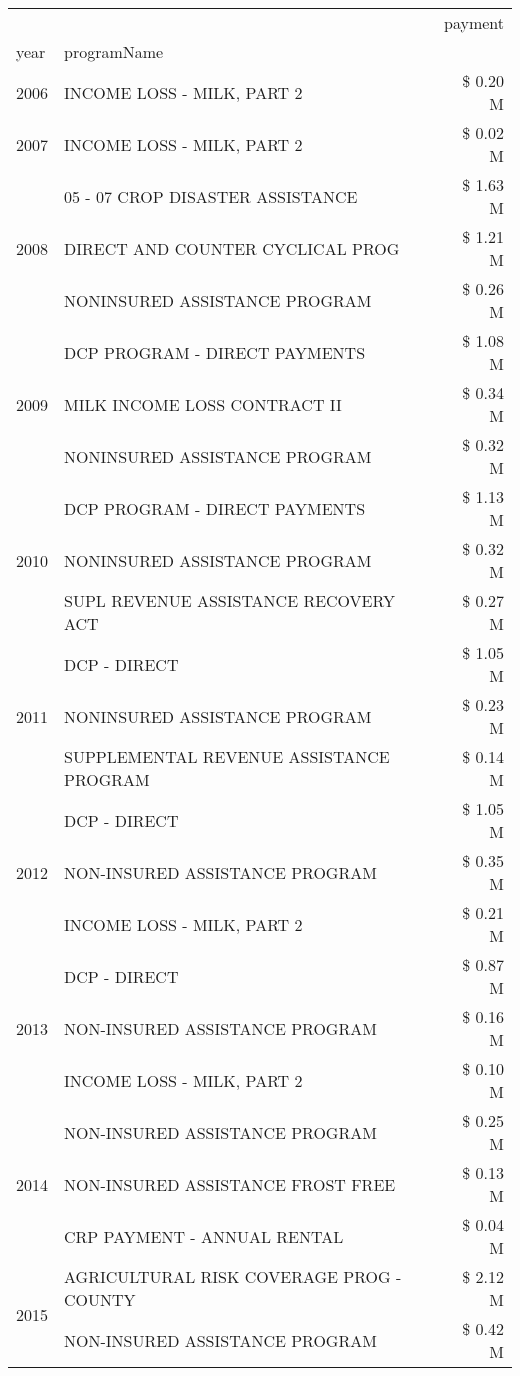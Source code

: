 \begin{tabular}{llr}
\toprule
 &  & payment \\
year & programName &  \\
\midrule
2006 & INCOME LOSS - MILK, PART 2 & \$ 0.20 M \\
\cline{1-3}
2007 & INCOME LOSS - MILK, PART 2 & \$ 0.02 M \\
\cline{1-3}
\multirow[t]{3}{*}{2008} & 05 - 07 CROP DISASTER ASSISTANCE & \$ 1.63 M \\
 & DIRECT AND COUNTER CYCLICAL PROG & \$ 1.21 M \\
 & NONINSURED ASSISTANCE PROGRAM & \$ 0.26 M \\
\cline{1-3}
\multirow[t]{3}{*}{2009} & DCP PROGRAM - DIRECT PAYMENTS & \$ 1.08 M \\
 & MILK INCOME LOSS CONTRACT II & \$ 0.34 M \\
 & NONINSURED ASSISTANCE PROGRAM & \$ 0.32 M \\
\cline{1-3}
\multirow[t]{3}{*}{2010} & DCP PROGRAM - DIRECT PAYMENTS & \$ 1.13 M \\
 & NONINSURED ASSISTANCE PROGRAM & \$ 0.32 M \\
 & SUPL REVENUE ASSISTANCE RECOVERY ACT & \$ 0.27 M \\
\cline{1-3}
\multirow[t]{3}{*}{2011} & DCP - DIRECT & \$ 1.05 M \\
 & NONINSURED ASSISTANCE PROGRAM & \$ 0.23 M \\
 & SUPPLEMENTAL REVENUE ASSISTANCE PROGRAM & \$ 0.14 M \\
\cline{1-3}
\multirow[t]{3}{*}{2012} & DCP - DIRECT & \$ 1.05 M \\
 & NON-INSURED ASSISTANCE PROGRAM & \$ 0.35 M \\
 & INCOME LOSS - MILK, PART 2 & \$ 0.21 M \\
\cline{1-3}
\multirow[t]{3}{*}{2013} & DCP - DIRECT & \$ 0.87 M \\
 & NON-INSURED ASSISTANCE PROGRAM & \$ 0.16 M \\
 & INCOME LOSS - MILK, PART 2 & \$ 0.10 M \\
\cline{1-3}
\multirow[t]{3}{*}{2014} & NON-INSURED ASSISTANCE PROGRAM & \$ 0.25 M \\
 & NON-INSURED ASSISTANCE FROST FREE & \$ 0.13 M \\
 & CRP PAYMENT - ANNUAL RENTAL & \$ 0.04 M \\
\cline{1-3}
\multirow[t]{3}{*}{2015} & AGRICULTURAL RISK COVERAGE PROG - COUNTY & \$ 2.12 M \\
 & NON-INSURED ASSISTANCE PROGRAM & \$ 0.42 M \\

\end{tabular}
